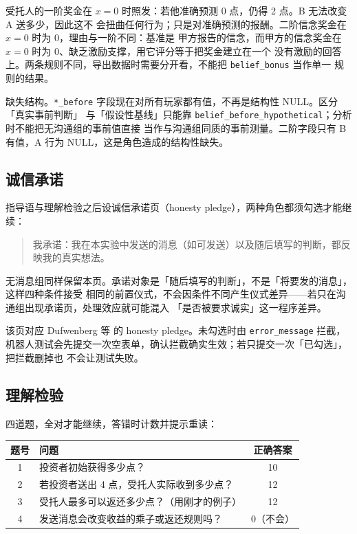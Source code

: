 \documentclass[10pt,a4paper]{ctexart}
\newcommand{\code}[1]{\texttt{#1}}
\begin{document}
受托人的一阶奖金在 $x=0$ 时照发：若他准确预测 0 点，仍得 2 点。B 无法改变 A 送多少，因此这不
会扭曲任何行为；只是对准确预测的报酬。二阶信念奖金在 $x=0$ 时为 0，理由与一阶不同：基准是
甲方报告的信念，而甲方的信念奖金在 $x=0$ 时为 0、缺乏激励支撑，用它评分等于把奖金建立在一个
没有激励的回答上。两条规则不同，导出数据时需要分开看，不能把 \code{belief\_bonus} 当作单一
规则的结果。

缺失结构。\code{*\_before} 字段现在对所有玩家都有值，不再是结构性 NULL。区分「真实事前判断」
与「假设性基线」只能靠 \code{belief\_before\_hypothetical}；分析时不能把无沟通组的事前值直接
当作与沟通组同质的事前测量。二阶字段只有 B 有值，A 行为 NULL，这是角色造成的结构性缺失。

\subsection{诚信承诺}

指导语与理解检验之后设诚信承诺页（honesty pledge），两种角色都须勾选才能继续：

\begin{quote}\small
我承诺：我在本实验中发送的消息（如可发送）以及随后填写的判断，都反映我的真实想法。
\end{quote}

无消息组同样保留本页。承诺对象是「随后填写的判断」，不是「将要发的消息」，这样四种条件接受
相同的前置仪式，不会因条件不同产生仪式差异——若只在沟通组出现承诺页，处理效应就可能混入
「是否被要求诚实」这一程序差异。

该页对应 Dufwenberg 等\cite{dufwenberg2026} 的 honesty pledge。未勾选时由 \code{error\_message}
拦截，机器人测试会先提交一次空表单，确认拦截确实生效；若只提交一次「已勾选」，把拦截删掉也
不会让测试失败。

\subsection{理解检验}

四道题，全对才能继续，答错时计数并提示重读：

\begin{table}[h]
\centering\small
\begin{tabular}{clc}
\toprule
题号 & 问题 & 正确答案 \\
\midrule
1 & 投资者初始获得多少点？ & 10 \\
2 & 若投资者送出 4 点，受托人实际收到多少点？ & 12 \\
3 & 受托人最多可以返还多少点？（用刚才的例子） & 12 \\
4 & 发送消息会改变收益的乘子或返还规则吗？ & 0（不会） \\
\bottomrule
\end{tabular}
\end{table}
\end{document}
